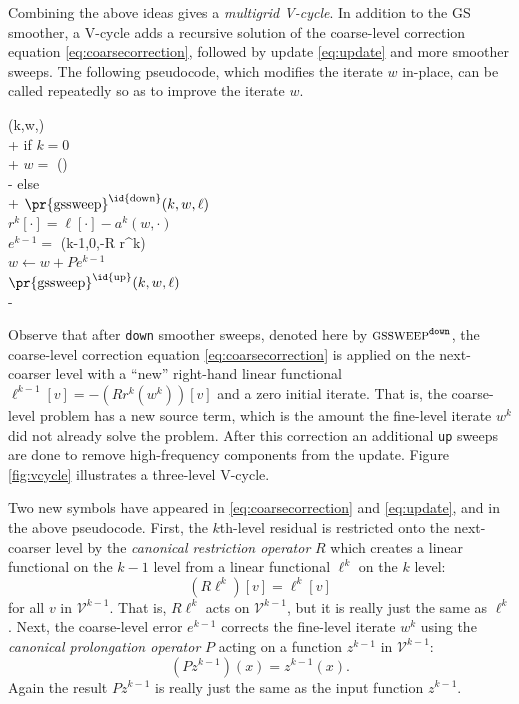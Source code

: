 \documentclass[letterpaper,final,12pt,reqno]{amsart}
\numberwithin{equation}{section}
\numberwithin{figure}{section}
\numberwithin{table}{section}
\begin{document}
Combining the above ideas gives a \emph{multigrid V-cycle}.  In addition to the GS smoother, a V-cycle adds a recursive solution of the coarse-level correction equation \eqref{eq:coarsecorrection}, followed by update \eqref{eq:update} and more smoother sweeps.  The following pseudocode, which modifies the iterate $w$ in-place, can be called repeatedly so as to improve the iterate $w$.

\begin{pseudo*}
(k,w,\ell)\text{:} \\+
    if $k=0$ \\+
        $w =$ (\ell) \\-  %
    else \\+
        $\text{\pr{gssweep}}^{\text{\id{down}}}(k,w,\ell)$ \\
        $r^k[\cdot] = \ell[\cdot] - a^k(w,\cdot)$ \\
        $e^{k-1} =$ (k-1,0,-R r^k) \\
        $w \gets w + P e^{k-1}$ \\
        $\text{\pr{gssweep}}^{\text{\id{up}}}(k,w,\ell)$ \\-
\end{pseudo*}

Observe that after \texttt{down} smoother sweeps, denoted here by $\text{\textsc{gssweep}}^{\text{\texttt{down}}}$, the coarse-level correction equation \eqref{eq:coarsecorrection} is applied on the next-coarser level with a ``new'' right-hand linear functional $\ell^{k-1}[v]=-(R r^k(w^k))[v]$ and a zero initial iterate.  That is, the coarse-level problem has a new source term, which is the amount the fine-level iterate $w^k$ did not already solve the problem.  After this correction an additional \texttt{up} sweeps are done to remove high-frequency components from the update.  Figure \ref{fig:vcycle} illustrates a three-level V-cycle.

Two new symbols have appeared in \eqref{eq:coarsecorrection} and \eqref{eq:update}, and in the above pseudocode.  First, the $k$th-level residual is restricted onto the next-coarser level by the \emph{canonical restriction operator} $R$ which creates a linear functional on the $k-1$ level from a linear functional $\ell^k$ on the $k$ level:
\begin{equation}
  (R \ell^k)[v] = \ell^k[v] \label{eq:canonicalrestriction}
\end{equation}
for all $v$ in $\mathcal{V}^{k-1}$.  That is, $R \ell^k$ acts on $\mathcal{V}^{k-1}$, but it is really just the same as $\ell^k$.  Next, the coarse-level error $e^{k-1}$ corrects the fine-level iterate $w^k$ using the \emph{canonical prolongation operator} $P$ acting on a function $z^{k-1}$ in $\mathcal{V}^{k-1}$:
\begin{equation}
  (P z^{k-1})(x) = z^{k-1}(x). \label{eq:canonicalprolongation}
\end{equation}
Again the result $P z^{k-1}$ is really just the same as the input function $z^{k-1}$.
\end{document}
